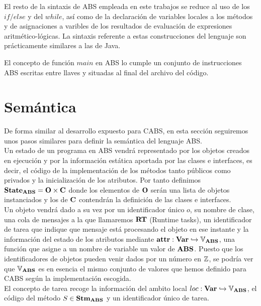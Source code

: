 El resto de la sintaxis de ABS empleada en este trabajos se reduce al uso de los $if/else$ y del $while$, así como de la declaración de variables locales a los métodos y de asignaciones a varibles de los resultados de evaluación de expresiones aritmético-lógicas. La sintaxis referente a estas construcciones del lenguaje son prácticamente similares a las de Java.

El concepto de función $main$ en ABS lo cumple un conjunto de instrucciones ABS escritas entre llaves y situadas al final del archivo del código.

\section{Semántica}

De forma similar al desarrollo expuesto para CABS, en esta sección seguiremos unos pasos similares para definir la semántica del lenguaje ABS.\\

Un estado de un programa en ABS vendrá representado por los objetos creados en ejecución y por la información estática aportada por las clases e interfaces, es decir, el código de la implementación de los métodos tanto públicos como privados y la inicialización de los atributos. Por tanto definimos $\textbf{State}_{\textbf{ABS}} = \mathbf{O} \times \mathbf{C}$ donde los elementos de $\mathbf{O}$ serán una lista de objetos instanciados y los de $\mathbf{C}$ contendrán la definición de las clases e interfaces.\\

Un objeto vendrá dado a su vez por un identificador único $o$, su nombre de clase, una cola de mensajes a la que llamaremos $\textbf{RT}$ (Runtime tasks), un identificador de tarea que indique que mensaje está procesando el objeto en ese instante y la información del estado de los atributos mediante $\textbf{attr}: \textbf{Var} \hookrightarrow \mathbb{V}_{\textbf{ABS}}$, una función que asigne a un nombre de variable un valor de $\textbf{ABS}$. Puesto que los identificadores de objetos pueden venir dados por un número en $\mathbb{Z}$, se podría ver que $\mathbb{V}_{\textbf{ABS}}$ es en esencia el mismo conjunto de valores que hemos definido para CABS según la implementación escogida.\\

El concepto de tarea recoge la información del ambito local $loc: \textbf{Var} \hookrightarrow \mathbb{V}_{\textbf{ABS}}$, el código del método $S \in \textbf{Stm}_{\textbf{ABS}}$ y un identificador único de tarea.\\

